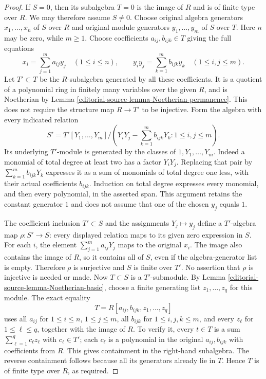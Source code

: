 \begin{proof}
If $S=0$, then its subalgebra $T=0$ is the image of $R$ and
is of finite type over $R$. We may therefore assume $S\neq0$.
Choose original algebra generators $x_1,\ldots,x_n$ of $S$
over $R$ and original module generators $y_1,\ldots,y_m$ of
$S$ over $T$. Here $n$ may be zero, while $m\geq1$.
Choose coefficients $a_{ij},b_{ijk}\in T$ giving the full equations
$$
x_i=\sum_{j=1}^m a_{ij}y_j\quad(1\leq i\leq n),\qquad
y_i y_j=\sum_{k=1}^m b_{ijk}y_k\quad(1\leq i,j\leq m).
$$
Let $T'\subset T$ be the $R$-subalgebra generated by all these
coefficients. It is a quotient of a polynomial ring in finitely
many variables over the given $R$, and is Noetherian by
Lemma \ref{editorial-source-lemma-Noetherian-permanence}. This does not require
the structure map $R\to T'$ to be injective.
Form the algebra with every indicated relation
$$
S'=T'[Y_1,\ldots,Y_m]\big/
\left(Y_iY_j-\sum_{k=1}^m b_{ijk}Y_k:
1\leq i,j\leq m\right).
$$
Its underlying $T'$-module is generated by the classes of
$1,Y_1,\ldots,Y_m$. Indeed a monomial of total degree at least
two has a factor $Y_iY_j$. Replacing that pair by
$\sum_{k=1}^m b_{ijk}Y_k$ expresses it as a sum of monomials
of total degree one less, with their actual coefficients
$b_{ijk}$. Induction on total degree expresses every monomial,
and then every polynomial, in the asserted span. This argument
retains the constant generator $1$ and does not assume that one
of the chosen $y_j$ equals $1$.

The coefficient inclusion $T'\subset S$ and the assignments
$Y_j\mapsto y_j$ define a $T'$-algebra map $\rho:S'\to S$:
every displayed relation maps to its given zero expression in $S$.
For each $i$, the element $\sum_{j=1}^m a_{ij}Y_j$ maps to
the original $x_i$. The image also contains the image of $R$,
so it contains all of $S$, even if the algebra-generator list is
empty. Therefore $\rho$ is surjective and $S$ is finite over
$T'$. No assertion that $\rho$ is injective is needed or made.
Now $T\subset S$ is a $T'$-submodule. By
Lemma \ref{editorial-source-lemma-Noetherian-basic}, choose a finite generating
list $z_1,\ldots,z_q$ for this module. The exact equality
$$
T=R[a_{ij},b_{ijk},z_1,\ldots,z_q]
$$
uses all $a_{ij}$ for $1\leq i\leq n$, $1\leq j\leq m$,
all $b_{ijk}$ for $1\leq i,j,k\leq m$, and every $z_\ell$
for $1\leq\ell\leq q$, together with the image of $R$.
To verify it, every $t\in T$ is a sum
$\sum_{\ell=1}^q c_\ell z_\ell$ with $c_\ell\in T'$;
each $c_\ell$ is a polynomial in the original $a_{ij},b_{ijk}$
with coefficients from $R$. This gives containment in the
right-hand subalgebra. The reverse containment follows because
all its generators already lie in $T$. Hence $T$ is of finite
type over $R$, as required.
\end{proof}


